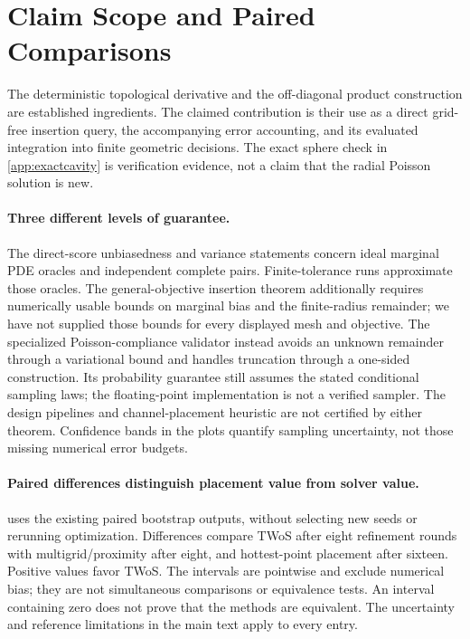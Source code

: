 \section{Claim Scope and Paired Comparisons}
\label{app:claimscope}

The deterministic topological derivative and the off-diagonal product
construction are established ingredients. The claimed contribution is their
use as a direct grid-free insertion query, the accompanying error accounting,
and its evaluated integration into finite geometric decisions. The exact
sphere check in \cref{app:exactcavity} is verification evidence, not a claim
that the radial Poisson solution is new.

\paragraph{Three different levels of guarantee.}
The direct-score unbiasedness and variance statements concern ideal marginal
PDE oracles and independent complete pairs. Finite-tolerance runs approximate
those oracles. The general-objective insertion theorem additionally requires
numerically usable bounds on marginal bias and the finite-radius remainder;
we have not supplied those bounds for every displayed mesh and objective.
The specialized Poisson-compliance validator instead avoids an unknown
remainder through a variational bound and handles truncation through a
one-sided construction. Its probability guarantee still assumes the stated
conditional sampling laws; the floating-point implementation is not a
verified sampler. The design pipelines and channel-placement heuristic are
not certified by either theorem. Confidence bands in the plots quantify
sampling uncertainty, not those missing numerical error budgets.

\paragraph{Paired differences distinguish placement value from solver value.}
 uses the existing paired bootstrap outputs,
without selecting new seeds or rerunning optimization. Differences compare
TWoS after eight refinement rounds with multigrid/proximity after eight,
and hottest-point placement after sixteen. Positive values favor TWoS.
The intervals are pointwise and exclude numerical bias; they are not
simultaneous comparisons or equivalence tests. An interval containing zero
does not prove that the methods are equivalent. The uncertainty and reference
limitations in the main text apply to every entry.


